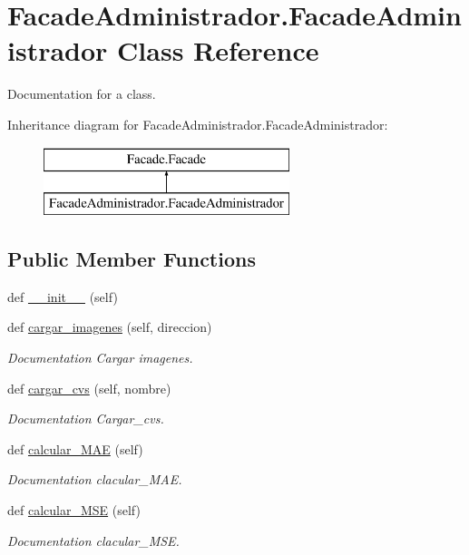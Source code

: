 \hypertarget{class_facade_administrador_1_1_facade_administrador}{}\section{Facade\+Administrador.\+Facade\+Administrador Class Reference}
\label{class_facade_administrador_1_1_facade_administrador}


Documentation for a class.  


Inheritance diagram for Facade\+Administrador.\+Facade\+Administrador\+:\begin{figure}[H]
\begin{center}
\leavevmode
\includegraphics[height=2.000000cm]{class_facade_administrador_1_1_facade_administrador}
\end{center}
\end{figure}
\subsection*{Public Member Functions}
\begin{DoxyCompactItemize}
\item 
def \mbox{\hyperlink{class_facade_administrador_1_1_facade_administrador_aaa6a3941eb11cb692c9ecc712db5af0b}{\+\_\+\+\_\+init\+\_\+\+\_\+}} (self)
\item 
def \mbox{\hyperlink{class_facade_administrador_1_1_facade_administrador_aca7528cedb162799ab858010207a5dab}{cargar\+\_\+imagenes}} (self, direccion)
\begin{DoxyCompactList}\small\item\em Documentation Cargar imagenes. \end{DoxyCompactList}\item 
def \mbox{\hyperlink{class_facade_administrador_1_1_facade_administrador_aaf2e6dac8063826680c1ae5a62314e2f}{cargar\+\_\+cvs}} (self, nombre)
\begin{DoxyCompactList}\small\item\em Documentation Cargar\+\_\+cvs. \end{DoxyCompactList}\item 
def \mbox{\hyperlink{class_facade_administrador_1_1_facade_administrador_ac65ea555d12893eb9ce5a1ec20c31165}{calcular\+\_\+\+M\+AE}} (self)
\begin{DoxyCompactList}\small\item\em Documentation clacular\+\_\+\+M\+AE. \end{DoxyCompactList}\item 
def \mbox{\hyperlink{class_facade_administrador_1_1_facade_administrador_a06b10fce3e70d4292f4c2fae5026643c}{calcular\+\_\+\+M\+SE}} (self)
\begin{DoxyCompactList}\small\item\em Documentation clacular\+\_\+\+M\+SE. \end{DoxyCompactList}\end{DoxyCompactItemize}
